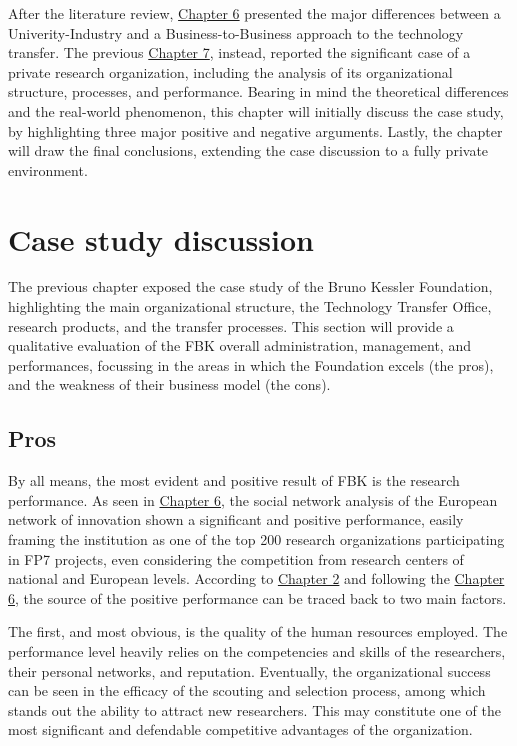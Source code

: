

\label{Chapter8} %

After the literature review, \hyperref[Chapter6]{Chapter 6} presented the major differences between a Univerity-Industry and a Business-to-Business approach to the technology transfer. The previous \hyperref[Chapter7]{Chapter 7}, instead, reported the significant case of a private research organization, including the analysis of its organizational structure, processes, and performance. Bearing in mind the theoretical differences and the real-world phenomenon, this chapter will initially discuss the case study, by highlighting three major positive and negative arguments. Lastly, the chapter will draw the final conclusions, extending the case discussion to a fully private environment.

\section{Case study discussion}

The previous chapter exposed the case study of the Bruno Kessler Foundation, highlighting the main organizational structure, the Technology Transfer Office, research products, and the transfer processes. This section will provide a qualitative evaluation of the FBK overall administration, management, and performances, focussing in the areas in which the Foundation excels (the pros), and the weakness of their business model (the cons).

\subsection{Pros}

By all means, the most evident and positive result of FBK is the research performance. As seen in \hyperref[Chapter6]{Chapter 6}, the social network analysis of the European network of innovation shown a significant and positive performance, easily framing the institution as one of the top 200 research organizations participating in FP7 projects, even considering the competition from research centers of national and European levels. According to \hyperref[Chapter2]{Chapter 2} and following the \hyperref[Chapter6]{Chapter 6}, the source of the positive performance can be traced back to two main factors.

The first, and most obvious, is the quality of the human resources employed. The performance level heavily relies on the competencies and skills of the researchers, their personal networks, and reputation. Eventually, the organizational success can be seen in the efficacy of the scouting and selection process, among which stands out the ability to attract new researchers. This may constitute one of the most significant and defendable competitive advantages of the organization. 


